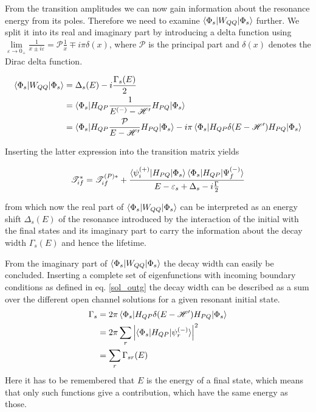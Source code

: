 From the transition amplitudes we can now gain information about
the resonance energy from its poles. Therefore we need to examine
$\braket{\Phi_s|W_{QQ}|\Phi_s}$ further.
We split it into
its real and imaginary part by introducing a delta function using 
$\lim\limits_{\varepsilon \to 0_+} \frac{1}{x \pm i\varepsilon}
 = \mathscr{P} \frac 1x \mp i\pi\delta(x)$,
where $\mathscr{P}$ is the principal part and $\delta(x)$ denotes the
Dirac delta function. \cite{Cohen-Tannoudji_3_2}

\begin{align}
  \braket{\Phi_s|W_{QQ}|\Phi_s} & = \Delta_s(E) - i \frac{\Gamma_s(E)}{2}\\
                                & = \braket{\Phi_s|H_{QP}
                                    \frac{1}{E^{(-)} - \mathscr{H}'}H_{PQ}|\Phi_s}\\
                                & = \braket{\Phi_s|H_{QP}
                                    \frac{\mathcal{P}}{E - \mathscr{H}'}H_{PQ}|\Phi_s}
                                    - i\pi \braket{\Phi_s|H_{QP}\delta(E-\mathscr{H}')H_{PQ}
                                    |\Phi_s} 
\end{align}

Inserting the latter expression into the transition matrix yields

\begin{equation}
  \mathscr{T}_{if}^* = \mathscr{T}_{if}^{(P)*} + 
                     \frac{\braket{\psi_i^{(+)}|H_{PQ}|\Phi_s}
                           \braket{\Phi_s|H_{QP}|\Psi_f^{(-)}}}
                          {E-\varepsilon_s + \Delta_s - i \frac{\Gamma}{2}}
\end{equation}

from which now the real part of $\braket{\Phi_s|W_{QQ}|\Phi_s}$ can be interpreted 
as an energy shift $\Delta_s(E)$ of the resonance introduced by the interaction of the initial
with the final states and its imaginary part to carry the information about the
decay width $\Gamma_s(E)$ and hence the lifetime.


From the imaginary part of $\braket{\Phi_s|W_{QQ}|\Phi_s}$ the decay width can
easily be concluded. Inserting a complete set
of eigenfunctions with incoming boundary conditions as defined in
eq. \ref{sol_outg} the decay width can be described
as a sum over the different open channel solutions for a given resonant initial state.
\begin{align}
  \Gamma_s & = 2 \pi \braket{\Phi_s|H_{QP}\delta(E - \mathscr{H}')H_{PQ}|\Phi_s}
               \label{equation:Gamma_HE}\\
           & = 2 \pi \sum\limits_r \left | \braket{\Phi_s|H_{QP}|\psi_r^{(-)}} \right|^2
                 \label{equation:Gamma_HQP}\\
           & = \sum\limits_r \Gamma_{sr}(E)
\end{align}
Here it has to be remembered that $E$ is the energy of a final state, which means that
only such functions give a contribution, which have the same energy as those.

